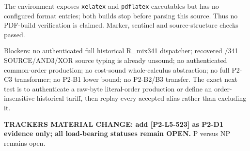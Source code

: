 \documentclass[11pt]{article}
\begin{document}
The environment exposes \texttt{xelatex} and \texttt{pdflatex} executables but has no configured format entries; both builds stop before parsing this source. Thus no PDF-build verification is claimed. Marker, sentinel and source-structure checks passed.

Blockers: no authenticated full historical R\_mix341 dispatcher; recovered /341 SOURCE/AND3/XOR source typing is already unsound; no authenticated common-order production; no cost-sound whole-calculus abstraction; no full P2-C3 transformer; no P2-B1 lower bound; no P2-B2/B3 transfer. The exact next test is to authenticate a raw-byte literal-order production or define an order-insensitive historical tariff, then replay every accepted alias rather than excluding it.

\textbf{TRACKERS MATERIAL CHANGE: add [P2-L5-523] as P2-D1 evidence only; all load-bearing statuses remain OPEN.} P versus NP remains open.
\end{document}
